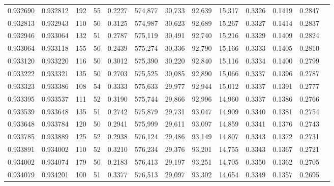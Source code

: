 \begin{tabular}{rrrrrrrrrrrrr}
0.932690 & 0.932812 &   192 &  55 &                                     0.2227 & 574,877 &  30,733 &  92,639 &  15,317 & 0.3326 & 0.1419 & 0.2847 \\
0.932813 & 0.932943 &   110 &  50 &                                     0.3125 & 574,987 &  30,623 &  92,689 &  15,267 & 0.3327 & 0.1414 & 0.2837 \\
0.932946 & 0.933064 &   132 &  51 &                                     0.2787 & 575,119 &  30,491 &  92,740 &  15,216 & 0.3329 & 0.1409 & 0.2824 \\
0.933064 & 0.933118 &   155 &  50 &                                     0.2439 & 575,274 &  30,336 &  92,790 &  15,166 & 0.3333 & 0.1405 & 0.2810 \\
0.933120 & 0.933220 &   116 &  50 &                                     0.3012 & 575,390 &  30,220 &  92,840 &  15,116 & 0.3334 & 0.1400 & 0.2799 \\
0.933222 & 0.933321 &   135 &  50 &                                     0.2703 & 575,525 &  30,085 &  92,890 &  15,066 & 0.3337 & 0.1396 & 0.2787 \\
0.933323 & 0.933386 &   108 &  54 &                                     0.3333 & 575,633 &  29,977 &  92,944 &  15,012 & 0.3337 & 0.1391 & 0.2777 \\
0.933395 & 0.933537 &   111 &  52 &                                     0.3190 & 575,744 &  29,866 &  92,996 &  14,960 & 0.3337 & 0.1386 & 0.2766 \\
0.933539 & 0.933648 &   135 &  51 &                                     0.2742 & 575,879 &  29,731 &  93,047 &  14,909 & 0.3340 & 0.1381 & 0.2754 \\
0.933648 & 0.933784 &   120 &  50 &                                     0.2941 & 575,999 &  29,611 &  93,097 &  14,859 & 0.3341 & 0.1376 & 0.2743 \\
0.933785 & 0.933889 &   125 &  52 &                                     0.2938 & 576,124 &  29,486 &  93,149 &  14,807 & 0.3343 & 0.1372 & 0.2731 \\
0.933891 & 0.934002 &   110 &  52 &                                     0.3210 & 576,234 &  29,376 &  93,201 &  14,755 & 0.3343 & 0.1367 & 0.2721 \\
0.934002 & 0.934074 &   179 &  50 &                                     0.2183 & 576,413 &  29,197 &  93,251 &  14,705 & 0.3350 & 0.1362 & 0.2705 \\
0.934079 & 0.934201 &   100 &  51 &                                     0.3377 & 576,513 &  29,097 &  93,302 &  14,654 & 0.3349 & 0.1357 & 0.2695 \\

\end{tabular}
